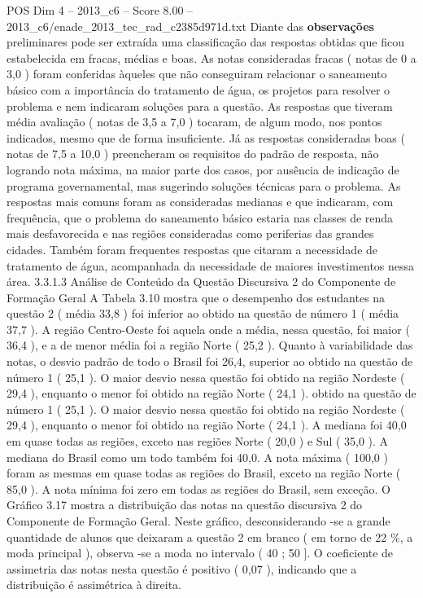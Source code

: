 \begin{textsample}{POS Dim 4 – 2013\_c6 – Score 8.00 – 2013\_c6/enade\_2013\_tec\_rad\_c2385d971d.txt}
Diante das \textbf{observações} preliminares pode ser extraída uma classificação das respostas obtidas que ficou estabelecida em fracas, médias e boas.
As notas consideradas fracas ( notas de 0 a 3,0 ) foram conferidas àqueles que não conseguiram relacionar o saneamento básico com a importância do tratamento de água, os projetos para resolver o problema e nem indicaram soluções para a questão.
As respostas que tiveram média avaliação ( notas de 3,5 a 7,0 ) tocaram, de algum modo, nos pontos indicados, mesmo que de forma insuficiente.
Já as respostas consideradas boas ( notas de 7,5 a 10,0 ) preencheram os requisitos do padrão de resposta, não logrando nota máxima, na maior parte dos casos, por ausência de indicação de programa governamental, mas sugerindo soluções técnicas para o problema.
As respostas mais comuns foram as consideradas medianas e que indicaram, com frequência, que o problema do saneamento básico estaria nas classes de renda mais desfavorecida e nas regiões consideradas como periferias das grandes cidades.
Também foram frequentes respostas que citaram a necessidade de tratamento de água, acompanhada da necessidade de maiores investimentos nessa área. 3.3.1.3 Análise de Conteúdo da Questão Discursiva 2 do Componente de Formação Geral A Tabela 3.10 mostra que o desempenho dos estudantes na questão 2 ( média 33,8 ) foi inferior ao obtido na questão de número 1 ( média 37,7 ).
A região Centro-Oeste foi aquela onde a média, nessa questão, foi maior ( 36,4 ), e a de menor média foi a região Norte ( 25,2 ).
Quanto à variabilidade das notas, o desvio padrão de todo o Brasil foi 26,4, superior ao obtido na questão de número 1 ( 25,1 ).
O maior desvio nessa questão foi obtido na região Nordeste ( 29,4 ), enquanto o menor foi obtido na região Norte ( 24,1 ). obtido na questão de número 1 ( 25,1 ).
O maior desvio nessa questão foi obtido na região Nordeste ( 29,4 ), enquanto o menor foi obtido na região Norte ( 24,1 ).
A mediana foi 40,0 em quase todas as regiões, exceto nas regiões Norte ( 20,0 ) e Sul ( 35,0 ).
A mediana do Brasil como um todo também foi 40,0.
A nota máxima ( 100,0 ) foram as mesmas em quase todas as regiões do Brasil, exceto na região Norte ( 85,0 ).
A nota mínima foi zero em todas as regiões do Brasil, sem exceção.
O Gráfico 3.17 mostra a distribuição das notas na questão discursiva 2 do Componente de Formação Geral.
Neste gráfico, desconsiderando -se a grande quantidade de alunos que deixaram a questão 2 em branco ( em torno de 22 \%, a moda principal ), observa -se a moda no intervalo ( 40 ; 50 ].
O coeficiente de assimetria das notas nesta questão é positivo ( 0,07 ), indicando que a distribuição é assimétrica à direita.

\end{textsample}
